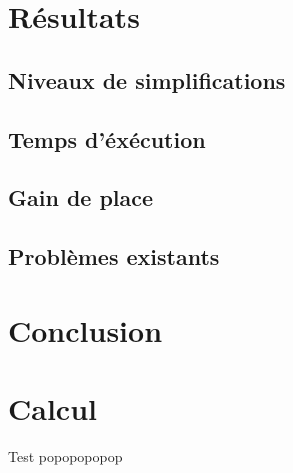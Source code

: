 \documentclass[12pt, twoside]{article}
\let\oldsection\section
\def\section{\cleardoublepage\oldsection}
\begin{document}
\section{Résultats}
\subsection{Niveaux de simplifications}
\subsection{Temps d'éxécution}
\subsection{Gain de place}
\subsection{Problèmes existants}

\newpage
\section*{Conclusion}

\newpage


\newpage
\appendix
\section{Calcul}
Test popopopopop
\end{document}

